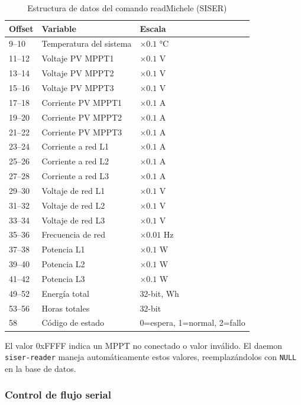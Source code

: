 \documentclass[12pt,a4paper]{article}
\begin{document}
\begin{table}[H]
\centering
\begin{tabular}{llp{6cm}}
\toprule
\textbf{Offset} & \textbf{Variable} & \textbf{Escala} \\
\midrule
9--10 & Temperatura del sistema & $\times 0.1$ °C \\
11--12 & Voltaje PV MPPT1 & $\times 0.1$ V \\
13--14 & Voltaje PV MPPT2 & $\times 0.1$ V \\
15--16 & Voltaje PV MPPT3 & $\times 0.1$ V \\
17--18 & Corriente PV MPPT1 & $\times 0.1$ A \\
19--20 & Corriente PV MPPT2 & $\times 0.1$ A \\
21--22 & Corriente PV MPPT3 & $\times 0.1$ A \\
23--24 & Corriente a red L1 & $\times 0.1$ A \\
25--26 & Corriente a red L2 & $\times 0.1$ A \\
27--28 & Corriente a red L3 & $\times 0.1$ A \\
29--30 & Voltaje de red L1 & $\times 0.1$ V \\
31--32 & Voltaje de red L2 & $\times 0.1$ V \\
33--34 & Voltaje de red L3 & $\times 0.1$ V \\
35--36 & Frecuencia de red & $\times 0.01$ Hz \\
37--38 & Potencia L1 & $\times 0.1$ W \\
39--40 & Potencia L2 & $\times 0.1$ W \\
41--42 & Potencia L3 & $\times 0.1$ W \\
49--52 & Energ\'ia total & 32-bit, Wh \\
53--56 & Horas totales & 32-bit \\
58 & C\'odigo de estado & 0=espera, 1=normal, 2=fallo \\
\bottomrule
\end{tabular}
\caption{Estructura de datos del comando readMichele (SISER)}
\end{table}

El valor 0xFFFF indica un MPPT no conectado o valor inv\'alido. El daemon \texttt{siser-reader} maneja autom\'aticamente estos valores, reemplaz\'andolos con \texttt{NULL} en la base de datos.

\subsubsection{Control de flujo serial}
\end{document}
